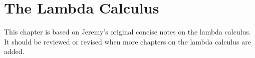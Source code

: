 \documentclass[../../../include/open-logic-chapter]{subfiles}
\begin{document}
\chapter{The Lambda Calculus}

\begin{editorial}
  This chapter is based on Jeremy's original concise notes on the
  lambda calculus. It should be reviewed or revised when more chapters
  on the lambda calculus are added.
\end{editorial}













\OLEndChapterHook
\end{document}
